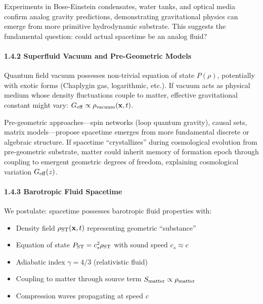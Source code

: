 \documentclass[10pt,a4paper]{article}
\providecommand{\tightlist}{\setlength{\itemsep}{0pt}\setlength{\parskip}{0pt}}
\begin{document}
Experiments in Bose-Einstein condensates, water tanks, and optical media
confirm analog gravity predictions, demonstrating gravitational physics
can emerge from more primitive hydrodynamic substrate. This suggests the
fundamental question: could actual spacetime be an analog fluid?

\paragraph{1.4.2 Superfluid Vacuum and Pre-Geometric
Models}\label{superfluid-vacuum-and-pre-geometric-models}

Quantum field vacuum possesses non-trivial equation of state
\(P(\rho)\), potentially with exotic forms (Chaplygin gas, logarithmic,
etc.). If vacuum acts as physical medium whose density fluctuations
couple to matter, effective gravitational constant might vary:
\(G_{\rm eff} \propto \rho_{\rm vacuum}({\bf x},t)\).

Pre-geometric approaches---spin networks (loop quantum gravity), causal
sets, matrix models---propose spacetime emerges from more fundamental
discrete or algebraic structure. If spacetime ``crystallizes'' during
cosmological evolution from pre-geometric substrate, matter could
inherit memory of formation epoch through coupling to emergent geometric
degrees of freedom, explaining cosmological variation
\(G_{\rm eff}(z)\).

\paragraph{1.4.3 Barotropic Fluid
Spacetime}\label{barotropic-fluid-spacetime}

We postulate: spacetime possesses barotropic fluid properties with:

\begin{itemize}
\tightlist
\item
  Density field \(\rho_{\rm ST}({\bf x},t)\) representing geometric
  ``substance''
\item
  Equation of state \(P_{\rm ST} = c_s^2 \rho_{\rm ST}\) with sound
  speed \(c_s \approx c\)
\item
  Adiabatic index \(\gamma = 4/3\) (relativistic fluid)
\item
  Coupling to matter through source term
  \(S_{\rm matter} \propto \rho_{\rm matter}\)
\item
  Compression waves propagating at speed \(c\)
\end{itemize}
\end{document}
